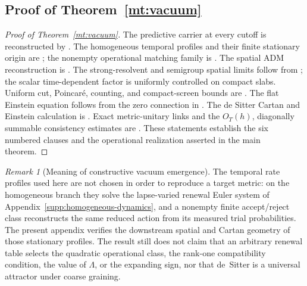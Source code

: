 \documentclass[11pt]{article}
\theoremstyle{definition}
\theoremstyle{remark}
\newtheorem{remark}[remark]{Remark}
\begin{document}
\subsection{Proof of Theorem~\ref{mt:vacuum}}

\begin{proof}[Proof of Theorem~\ref{mt:vacuum}]
The predictive carrier at every cutoff is reconstructed by
.  The homogeneous temporal profiles and
their finite stationary origin are
;
the nonempty operational matching family is
.  The spatial ADM reconstruction is
.  The strong-resolvent and
semigroup spatial limits follow from ; the scalar
time-dependent factor is uniformly controlled on compact slabs.  Uniform cut,
Poincar\'e, counting, and compact-screen bounds are
.  The flat Einstein equation follows from the
zero connection in .  The de Sitter Cartan and
Einstein calculation is .  Exact metric-unitary
links and the $O_T(h)$, diagonally summable consistency estimates are
.  These statements establish the six numbered clauses and the operational
realization asserted in the main theorem.
\end{proof}

\begin{remark}[Meaning of constructive vacuum emergence]
The temporal rate profiles used here are not chosen in order to reproduce a
target metric: on the homogeneous branch they solve the lapse-varied renewal
Euler system of Appendix~\ref{supp:homogeneous-dynamics}, and a nonempty finite
accept/reject class reconstructs the same reduced action from its measured
trial probabilities.  The present appendix verifies the downstream spatial and
Cartan geometry of those stationary profiles.  The result still does not claim
that an arbitrary renewal table selects the quadratic operational class, the
rank-one compatibility condition, the value of $\Lambda$, or the expanding
sign, nor that de~Sitter is a universal attractor under coarse graining.
\end{remark}
\end{document}
